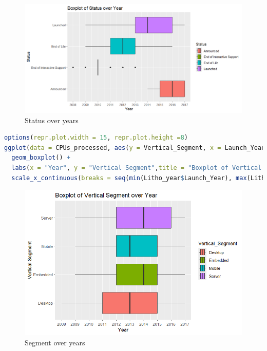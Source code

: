 \begin{figure}[ht]
  \centering
  \includegraphics[width=1\linewidth]{img/Status_Year.png}
  \vspace{1pt}
  \caption{Status over years}
\end{figure}

\begin{lstlisting}[language=R]
options(repr.plot.width = 15, repr.plot.height =8) 
ggplot(data = CPUs_processed, aes(y = Vertical_Segment, x = Launch_Year, fill = Vertical_Segment)) +
  geom_boxplot() +
  labs(x = "Year", y = "Vertical Segment",title = "Boxplot of Vertical Segment over Year") +
  scale_x_continuous(breaks = seq(min(Litho_year$Launch_Year), max(Litho_year$Launch_Year), by = 1))
\end{lstlisting}

\begin{figure}[ht]
  \centering
  \includegraphics[width=1\linewidth]{img/VSegment_Year.png}
  \vspace{1pt}
  \caption{Segment over years}
\end{figure}

